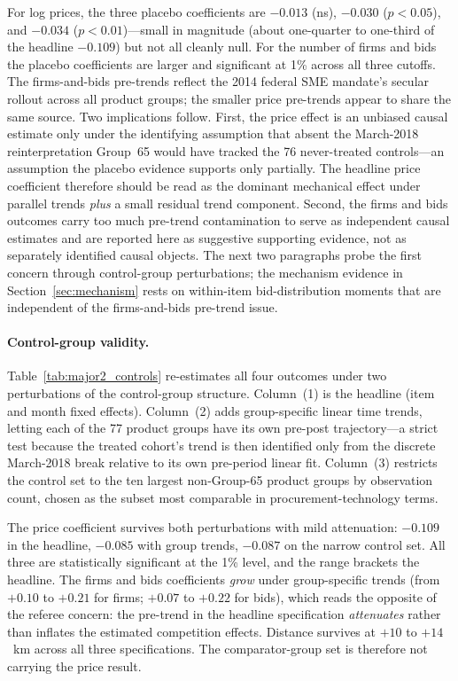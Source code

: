 

For log prices, the three placebo coefficients are $-0.013$ (ns), $-0.030$ ($p<0.05$), and $-0.034$ ($p<0.01$)---small in magnitude (about one-quarter to one-third of the headline $-0.109$) but not all cleanly null. For the number of firms and bids the placebo coefficients are larger and significant at 1\% across all three cutoffs. The firms-and-bids pre-trends reflect the 2014 federal SME mandate's secular rollout across all product groups; the smaller price pre-trends appear to share the same source. Two implications follow. First, the price effect is an unbiased causal estimate only under the identifying assumption that absent the March-2018 reinterpretation Group~65 would have tracked the 76 never-treated controls---an assumption the placebo evidence supports only partially. The headline price coefficient therefore should be read as the dominant mechanical effect under parallel trends \emph{plus} a small residual trend component. Second, the firms and bids outcomes carry too much pre-trend contamination to serve as independent causal estimates and are reported here as suggestive supporting evidence, not as separately identified causal objects. The next two paragraphs probe the first concern through control-group perturbations; the mechanism evidence in Section~\ref{sec:mechanism} rests on within-item bid-distribution moments that are independent of the firms-and-bids pre-trend issue.

\paragraph{Control-group validity.}
Table~\ref{tab:major2_controls} re-estimates all four outcomes under two perturbations of the control-group structure. Column~(1) is the headline (item and month fixed effects). Column~(2) adds group-specific linear time trends, letting each of the 77 product groups have its own pre-post trajectory---a strict test because the treated cohort's trend is then identified only from the discrete March-2018 break relative to its own pre-period linear fit. Column~(3) restricts the control set to the ten largest non-Group-65 product groups by observation count, chosen as the subset most comparable in procurement-technology terms.



The price coefficient survives both perturbations with mild attenuation: $-0.109$ in the headline, $-0.085$ with group trends, $-0.087$ on the narrow control set. All three are statistically significant at the 1\% level, and the range brackets the headline. The firms and bids coefficients \emph{grow} under group-specific trends (from $+0.10$ to $+0.21$ for firms; $+0.07$ to $+0.22$ for bids), which reads the opposite of the referee concern: the pre-trend in the headline specification \emph{attenuates} rather than inflates the estimated competition effects. Distance survives at $+10$ to $+14$~km across all three specifications. The comparator-group set is therefore not carrying the price result.

